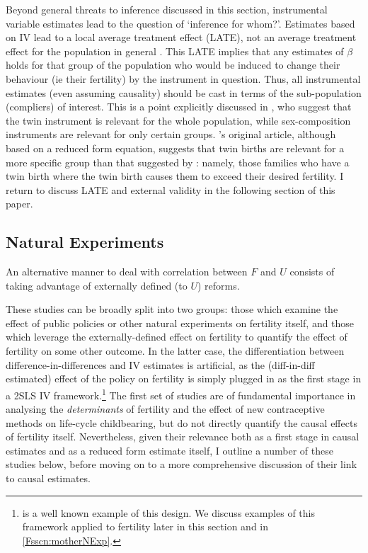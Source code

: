 Beyond general threats to inference discussed in this section, instrumental 
variable estimates lead to the question of `inference for whom?'.  Estimates 
based on IV lead to a local average treatment effect (LATE), not an average 
treatment effect for the population in general \citep{ImbensAngrist1994}.  This 
LATE implies that any estimates of $\beta$ holds for that group of the population 
who would be induced to change their behaviour (ie their fertility) by the 
instrument in question.  Thus, all instrumental estimates (even assuming causality)
should be cast in terms of the sub-population (compliers) of interest.  This is
a point explicitly discussed in \citet{Angristetal2010}, who suggest that the
twin instrument is relevant for the whole population, while sex-composition 
instruments are relevant for only certain groups. \citet{RosenzweigWolpin1980}'s 
original article, although based on a reduced form equation, suggests that twin 
births are relevant for a more specific group than that suggested by 
\citet{Angristetal2010}: namely, those families who have a twin birth where
the twin birth causes them to exceed their desired fertility.  I return to discuss 
LATE and external validity in the following section of this paper.



\subsection{Natural Experiments}
An alternative manner to deal with correlation between $F$ and $U$ consists of
taking advantage of externally defined (to $U$) reforms.

These studies can be broadly split into two groups: those which examine the
effect of public policies or other natural experiments on fertility itself,
and those which leverage the externally-defined effect on fertility to quantify
the effect of fertility on some other outcome.  In the latter case, the 
differentiation between difference-in-differences and IV estimates is artificial,
as the (diff-in-diff estimated) effect of the policy on fertility is simply 
plugged in as the first stage in a 2SLS IV framework.\footnote{\citet{Duflo2001} 
is a well known example of this design.  We discuss examples of this framework 
applied to fertility later in this section and in \ref{Fsscn:motherNExp}.} The 
first set of studies are of fundamental importance in analysing the 
\emph{determinants} of fertility and the effect of new contraceptive methods on 
life-cycle childbearing, but do not directly quantify the causal effects of 
fertility itself.  Nevertheless, given their relevance both as a first stage in 
causal estimates and as a reduced form estimate itself, I outline a number of 
these studies below, before moving on to a more comprehensive discussion of their 
link to causal estimates.

